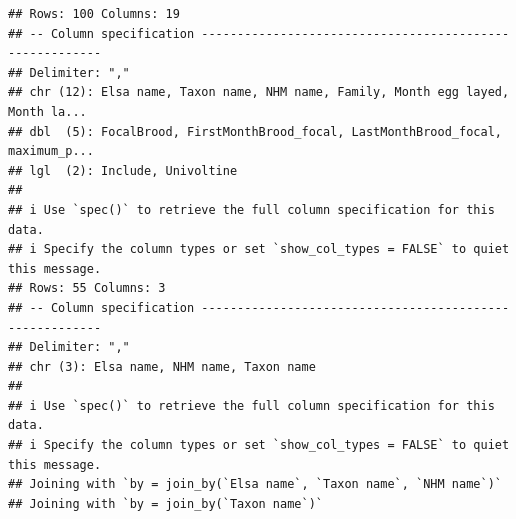 \documentclass[
]{article}
\begin{document}
\begin{verbatim}
## Rows: 100 Columns: 19
## -- Column specification --------------------------------------------------------
## Delimiter: ","
## chr (12): Elsa name, Taxon name, NHM name, Family, Month egg layed, Month la...
## dbl  (5): FocalBrood, FirstMonthBrood_focal, LastMonthBrood_focal, maximum_p...
## lgl  (2): Include, Univoltine
## 
## i Use `spec()` to retrieve the full column specification for this data.
## i Specify the column types or set `show_col_types = FALSE` to quiet this message.
## Rows: 55 Columns: 3
## -- Column specification --------------------------------------------------------
## Delimiter: ","
## chr (3): Elsa name, NHM name, Taxon name
## 
## i Use `spec()` to retrieve the full column specification for this data.
## i Specify the column types or set `show_col_types = FALSE` to quiet this message.
## Joining with `by = join_by(`Elsa name`, `Taxon name`, `NHM name`)`
## Joining with `by = join_by(`Taxon name`)`
\end{verbatim}
\end{document}
